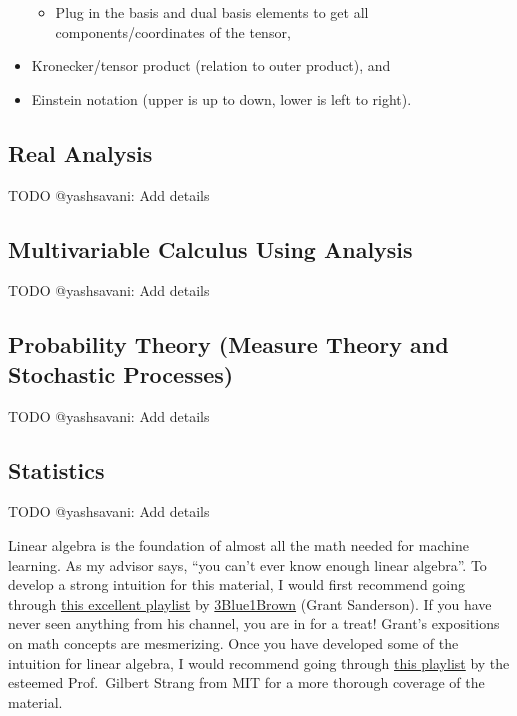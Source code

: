 \begin{itemize}
  \begin{itemize}
  \tightlist
  \item
    Plug in the basis and dual basis elements to get all
    components/coordinates of the tensor,
  \end{itemize}
\item
  Kronecker/tensor product (relation to outer product), and
\item
  Einstein notation (upper is up to down, lower is left to right).
\end{itemize}

\hypertarget{real-analysis}{%
\subsection{Real Analysis}\label{real-analysis}}

TODO @yashsavani: Add details

\hypertarget{multivariable-calculus-using-analysis}{%
\subsection{Multivariable Calculus Using
Analysis}\label{multivariable-calculus-using-analysis}}

TODO @yashsavani: Add details

\hypertarget{probability-theory-measure-theory-and-stochastic-processes}{%
\subsection{Probability Theory (Measure Theory and Stochastic
Processes)}\label{probability-theory-measure-theory-and-stochastic-processes}}

TODO @yashsavani: Add details

\hypertarget{statistics}{%
\subsection{Statistics}\label{statistics}}

TODO @yashsavani: Add details

Linear algebra is the foundation of almost all the math needed for
machine learning. As my advisor says, ``you can't ever know enough
linear algebra''. To develop a strong intuition for this material, I
would first recommend going through
\href{https://youtube.com/playlist?list=PLZHQObOWTQDPD3MizzM2xVFitgF8hE_ab}{this
excellent playlist} by \href{https://www.3blue1brown.com/}{3Blue1Brown}
(Grant Sanderson). If you have never seen anything from his channel, you
are in for a treat! Grant's expositions on math concepts are
mesmerizing. Once you have developed some of the intuition for linear
algebra, I would recommend going through
\href{https://youtube.com/playlist?list=PLE7DDD91010BC51F8}{this
playlist} by the esteemed Prof.~Gilbert Strang from MIT for a more
thorough coverage of the material.

